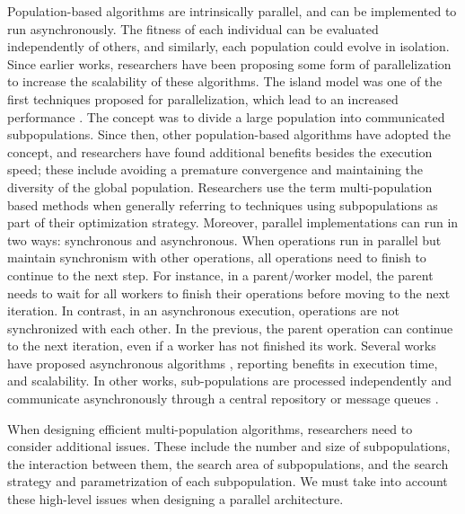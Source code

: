 \documentclass[review]{elsarticle}
\begin{document}
Population-based algorithms are intrinsically parallel, and can be implemented to run asynchronously. %
The fitness of each individual can be evaluated independently of 
others, and similarly, each population could evolve in isolation. Since 
earlier works, researchers have been proposing some form of parallelization
\cite{muhlenbein1988evolution} to increase the scalability of these algorithms.
The island model was one of the first techniques proposed for parallelization,
which lead to an increased performance \cite{gorges1990explicit,grosso1985computer}. 
The concept was to divide a large population into communicated subpopulations. 
Since then, other population-based algorithms have adopted the concept, 
and researchers have found additional benefits
besides the execution speed; these include avoiding a premature convergence and
maintaining the diversity of the global population. Researchers use the term
multi-population based methods when generally referring to techniques using
subpopulations as part of their optimization strategy. %
Moreover, parallel implementations can run in two ways: synchronous and
asynchronous. When operations run in parallel but maintain synchronism with
other operations,  all operations need to finish to continue to the next step.
For instance, in a  parent/worker model, the parent needs to wait for all
workers to finish their operations before moving to the next iteration.  In
contrast, in an asynchronous execution,  operations are not synchronized with
each other. In the previous, the parent operation can continue to the next
iteration, even if a worker has not finished its work.  Several works have
proposed asynchronous algorithms \cite{coleman89,baugh2003asynchronous}, reporting benefits in execution time, and
scalability. In other works, sub-populations
are processed independently and communicate asynchronously through a central
repository \cite{sofea:cec2012,agajaj} or message queues \cite{salza2019speed, guervos2018introducing} .

When designing efficient multi-population algorithms, researchers need to
consider additional issues. These include the number and size of subpopulations,
the interaction between them, the search area of subpopulations, and the search
strategy and parametrization of each subpopulation. We must take into account
these high-level issues when designing a parallel architecture. 
\end{document}
